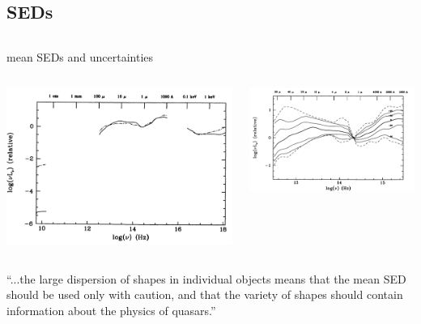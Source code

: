 \documentclass[landscape,9pt]{beamer}
\begin{document}
\subsection{SEDs}
\begin{frame}
	\begin{columns}
	\begin{column}{1.13\textwidth}
	\begin{block}{\citet{Elvis:1994} mean SEDs and uncertainties}
	\begin{columns}
		\begin{column}{0.4\textwidth}
			\includegraphics[width=\textwidth]{../images/Talk/elvis_94_mean}
		\end{column}
		\begin{column}{0.45\textwidth}
			\includegraphics[width=\textwidth]{../images/Talk/elvis_94_unc}
		\end{column}
	\end{columns}
	\vspace{5mm}
	``...the large dispersion of shapes in individual objects means that the mean SED should be used only with caution, 
	   and that the variety of shapes should contain information about the physics of quasars.''
	\end{block}
	\end{column}
	\end{columns}
\end{frame}
\end{document}
